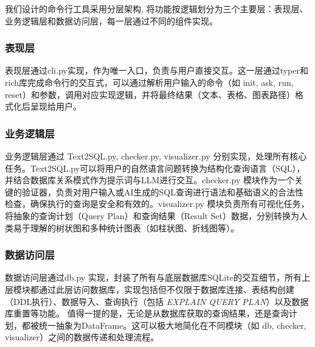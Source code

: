 \begin{CJK*}{UTF8}{song}

我们设计的命令行工具采用分层架构, 将功能按逻辑划分为三个主要层：表现层、业务逻辑层和数据访问层，每一层通过不同的组件实现。

{\begin{CJK*}{UTF8}{zhhei}\subsubsection{表现层}\end{CJK*}}

表现层通过cli.py实现，作为唯一入口，负责与用户直接交互。这一层通过typer和rich库完成命令行的交互式，可以通过解析用户输入的命令（如 init, ask, run, reset）和参数，调用对应实现逻辑，并将最终结果（文本、表格、图表路径）格式化后呈现给用户。
{\begin{CJK*}{UTF8}{zhhei}\subsubsection{业务逻辑层}\end{CJK*}}

业务逻辑层通过 Text2SQL.py, checker.py, visualizer.py 分别实现，处理所有核心任务。Text2SQL.py可以将用户的自然语言问题转换为结构化查询语言（SQL），并结合数据库关系模式作为提示词与LLM进行交互。checker.py 模块作为一个关键的验证器，负责对用户输入或AI生成的SQL查询进行语法和基础语义的合法性检查，确保执行的查询是安全和有效的。visualizer.py 模块负责所有可视化任务，将抽象的查询计划（Query Plan）和查询结果（Result Set）数据，分别转换为人类易于理解的树状图和多种统计图表（如柱状图、折线图等）。

{\begin{CJK*}{UTF8}{zhhei}\subsubsection{数据访问层}\end{CJK*}}

数据访问层通过db.py 实现，封装了所有与底层数据库SQLite的交互细节，所有上层模块都通过此层访问数据库，实现包括但不仅限于数据库连接、表结构创建（DDL执行）、数据导入、查询执行（包括 \textit{EXPLAIN QUERY PLAN}）以及数据库重置等功能。
值得一提的是，无论是从数据库获取的查询结果，还是查询计划，都被统一抽象为DataFrame。这可以极大地简化在不同模块（如 db, checker, visualizer）之间的数据传递和处理流程。

\end{CJK*}